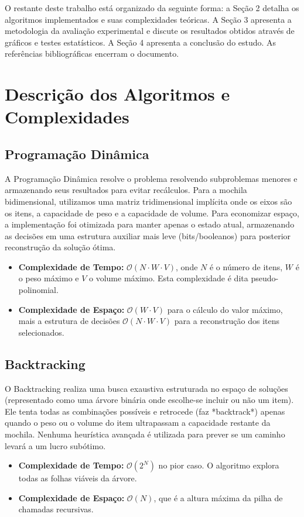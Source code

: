 \documentclass[12pt, a4paper]{article}
\begin{document}
O restante deste trabalho está organizado da seguinte forma: a Seção 2 detalha os algoritmos implementados e suas complexidades teóricas. A Seção 3 apresenta a metodologia da avaliação experimental e discute os resultados obtidos através de gráficos e testes estatísticos. A Seção 4 apresenta a conclusão do estudo. As referências bibliográficas encerram o documento.

\section{Descrição dos Algoritmos e Complexidades}

\subsection{Programação Dinâmica}
A Programação Dinâmica resolve o problema resolvendo subproblemas menores e armazenando seus resultados para evitar recálculos. Para a mochila bidimensional, utilizamos uma matriz tridimensional implícita onde os eixos são os itens, a capacidade de peso e a capacidade de volume. Para economizar espaço, a implementação foi otimizada para manter apenas o estado atual, armazenando as decisões em uma estrutura auxiliar mais leve (bits/booleanos) para posterior reconstrução da solução ótima.
\begin{itemize}
    \item \textbf{Complexidade de Tempo:} $\mathcal{O}(N \cdot W \cdot V)$, onde $N$ é o número de itens, $W$ é o peso máximo e $V$ o volume máximo. Esta complexidade é dita pseudo-polinomial.
    \item \textbf{Complexidade de Espaço:} $\mathcal{O}(W \cdot V)$ para o cálculo do valor máximo, mais a estrutura de decisões $\mathcal{O}(N \cdot W \cdot V)$ para a reconstrução dos itens selecionados.
\end{itemize}

\subsection{Backtracking}
O Backtracking realiza uma busca exaustiva estruturada no espaço de soluções (representado como uma árvore binária onde escolhe-se incluir ou não um item). Ele tenta todas as combinações possíveis e retrocede (faz *backtrack*) apenas quando o peso ou o volume do item ultrapassam a capacidade restante da mochila. Nenhuma heurística avançada é utilizada para prever se um caminho levará a um lucro subótimo.
\begin{itemize}
    \item \textbf{Complexidade de Tempo:} $\mathcal{O}(2^N)$ no pior caso. O algoritmo explora todas as folhas viáveis da árvore.
    \item \textbf{Complexidade de Espaço:} $\mathcal{O}(N)$, que é a altura máxima da pilha de chamadas recursivas.
\end{itemize}
\end{document}
